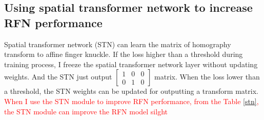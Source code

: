 \subsection{Using spatial transformer network to increase RFN performance}
Spatial transformer network (STN) can learn the matrix of homography transform to affine finger knuckle. If the loss higher than a threshold during training process, I freeze the spatial transformer network layer without updating weights. And the STN just output $\begin{bmatrix} 1 & 0 & 0 \\ 0 & 1 & 0 \end{bmatrix}$ matrix. When the loss lower than a threshold, the STN weights can be updated for outputting a transform matrix. \textcolor{red}{When I use the STN module to improve RFN performance, from the Table \ref{stn}, the STN module can improve the RFN model silght}

